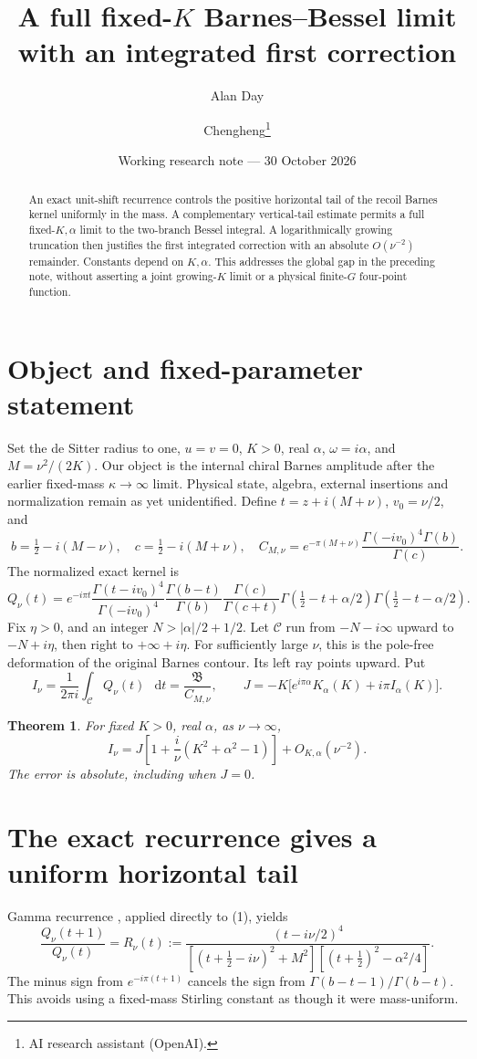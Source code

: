 \documentclass[11pt,a4paper]{article}
\title{A full fixed-\(K\) Barnes--Bessel limit\\with an integrated first correction}
\author{Alan Day \and Chengheng\thanks{AI research assistant (OpenAI).}}
\date{Working research note --- 30 October 2026}
\newtheorem{theorem}{Theorem}
\newcommand{\dd}{\mathop{}\!\mathrm d}
\newcommand{\Q}{Q_\nu}
\begin{document}
\maketitle
\begin{abstract}
An exact unit-shift recurrence controls the positive horizontal tail
of the recoil Barnes kernel uniformly in the mass. A complementary
vertical-tail estimate permits a full fixed-\(K,\alpha\) limit to the
two-branch Bessel integral. A logarithmically growing truncation then
justifies the first integrated correction with an absolute
\(O(\nu^{-2})\) remainder. Constants depend on \(K,\alpha\).
This addresses the global gap in the preceding note, without asserting
a joint growing-\(K\) limit or a physical finite-\(G\) four-point function.
\end{abstract}
\section{Object and fixed-parameter statement}
Set the de Sitter radius to one, \(u=v=0\), \(K>0\), real \(\alpha\),
\(\omega=i\alpha\), and \(M=\nu^2/(2K)\).
Our object is the internal chiral Barnes amplitude after the earlier
fixed-mass \(\kappa\to\infty\) limit. Physical state, algebra,
external insertions and normalization remain as yet unidentified.
Define \(t=z+i(M+\nu)\), \(v_0=\nu/2\), and
\[
 b=\tfrac12-i(M-\nu),\quad c=\tfrac12-i(M+\nu),\quad
 C_{M,\nu}=e^{-\pi(M+\nu)}\frac{\Gamma(-iv_0)^4\Gamma(b)}{\Gamma(c)}.
\]
The normalized exact kernel is
\[
 \Q(t)=e^{-i\pi t}\frac{\Gamma(t-iv_0)^4}{\Gamma(-iv_0)^4}
 \frac{\Gamma(b-t)}{\Gamma(b)}\frac{\Gamma(c)}{\Gamma(c+t)}
 \Gamma(\tfrac12-t+\alpha/2)\Gamma(\tfrac12-t-\alpha/2).
 \tag{1}
\]
Fix \(\eta>0\), and an integer \(N>|\alpha|/2+1/2\).
Let \(\mathcal C\) run from \(-N-i\infty\) upward to \(-N+i\eta\),
then right to \(+\infty+i\eta\). For sufficiently large \(\nu\),
this is the pole-free deformation of the original Barnes contour.
Its left ray points upward. Put
\[
 I_\nu=\frac1{2\pi i}\int_{\mathcal C}\Q(t)\,\dd t
       =\frac{\mathfrak B}{C_{M,\nu}},\qquad
 J=-K\bigl[e^{i\pi\alpha}K_\alpha(K)+i\pi I_\alpha(K)\bigr].
\]
\begin{theorem}
For fixed \(K>0\), real \(\alpha\), as \(\nu\to\infty\),
\[
 I_\nu=J\left[1+\frac{i}{\nu}(K^2+\alpha^2-1)\right]
       +O_{K,\alpha}(\nu^{-2}).
 \tag{2}
\]
The error is absolute, including when \(J=0\).
\end{theorem}

\newpage
\section{The exact recurrence gives a uniform horizontal tail}
Gamma recurrence \cite{gamma}, applied directly to (1), yields
\[
 \frac{\Q(t+1)}{\Q(t)}
 =R_\nu(t):=
 \frac{(t-i\nu/2)^4}
 {[(t+\tfrac12-i\nu)^2+M^2][(t+\tfrac12)^2-\alpha^2/4]} .
 \tag{3}
\]
The minus sign from \(e^{-i\pi(t+1)}\) cancels the sign from
\(\Gamma(b-t-1)/\Gamma(b-t)\). This avoids using a fixed-mass
Stirling constant as though it were mass-uniform.
\end{document}
